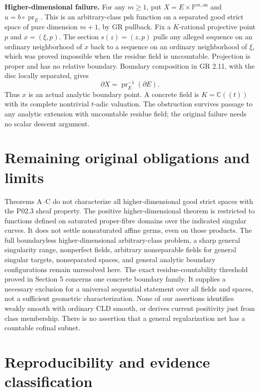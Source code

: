 \documentclass[11pt]{article}
\begin{document}
\textbf{Higher-dimensional failure.} For any \(m\ge1\), put \(X=E\times\mathbb P^{m,\mathrm{an}}\) and \(u=b\circ\operatorname{pr}_E\). This is an arbitrary-class psh function on a separated good strict space of pure dimension \(m+1\), by GR pullback. Fix a \(K\)-rational projective point \(p\) and \(x=(\xi,p)\). The section \(s(z)=(z,p)\) pulls any alleged sequence on an ordinary neighborhood of \(x\) back to a sequence on an ordinary neighborhood of \(\xi\), which was proved impossible when the residue field is uncountable. Projection is proper and has no relative boundary. Boundary composition in GR 2.11, with the disc locally separated, gives
\[
\partial X=\operatorname{pr}_E^{-1}(\partial E).
\]
Thus \(x\) is an actual analytic boundary point. A concrete field is \(K=\mathbb C((t))\) with its complete nontrivial \(t\)-adic valuation. The obstruction survives passage to any analytic extension with uncountable residue field; the original failure needs no scalar descent argument.

\section{Remaining original obligations and limits}

Theorems A--C do not characterize all higher-dimensional good strict spaces with the P02.3 sheaf property. The positive higher-dimensional theorem is restricted to functions defined on saturated proper-fibre domains over the indicated singular curves. It does not settle nonsaturated affine germs, even on those products. The full boundaryless higher-dimensional arbitrary-class problem, a sharp general singularity range, nonperfect fields, arbitrary nonseparable fields for general singular targets, nonseparated spaces, and general analytic boundary configurations remain unresolved here. The exact residue-countability threshold proved in Section 5 concerns one concrete boundary family. It supplies a necessary exclusion for a universal sequential statement over all fields and spaces, not a sufficient geometric characterization. None of our assertions identifies weakly smooth with ordinary CLD smooth, or derives current positivity just from class membership. There is no assertion that a general regularization net has a countable cofinal subnet.

\section{Reproducibility and evidence classification}
\end{document}
